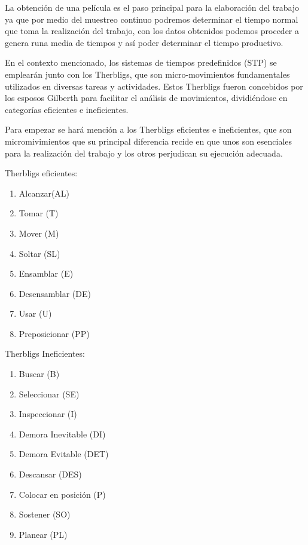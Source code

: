     La obtención de una película es el paso principal para la elaboración del trabajo ya que por medio del muestreo continuo podremos determinar el tiempo normal que toma la realización del trabajo, con los datos obtenidos podemos proceder a genera runa media de tiempos y así poder determinar el tiempo productivo.  
    
    En el contexto mencionado, los sistemas de tiempos predefinidos (STP) se emplearán junto con los Therbligs, que son micro-movimientos fundamentales utilizados en diversas tareas y actividades. Estos Therbligs fueron concebidos por los esposos Gilberth para facilitar el análisis de movimientos, dividiéndose en categorías eficientes e ineficientes.
    
    Para empezar se hará mención a los Therbligs eficientes e ineficientes, que son micromivimientos que su principal diferencia recide en que unos son esenciales para la realización del trabajo y los otros perjudican su ejecución adecuada. 
    
    Therbligs eficientes:
    \begin{enumerate}
        \item Alcanzar(AL)
        \item Tomar (T)
        \item Mover (M)
        \item Soltar (SL)
        \item Ensamblar (E)
        \item Desensamblar (DE)
        \item Usar (U)
        \item Preposicionar (PP)
    \end{enumerate}
    
    Therbligs Ineficientes:
    \begin{enumerate}
        \item Buscar (B)
        \item Seleccionar (SE)
        \item Inspeccionar (I)
        \item Demora Inevitable (DI)
        \item Demora Evitable (DET)
        \item Descansar (DES)
        \item Colocar en posición (P)
        \item Sostener (SO)
        \item Planear (PL)
    \end{enumerate}
    
